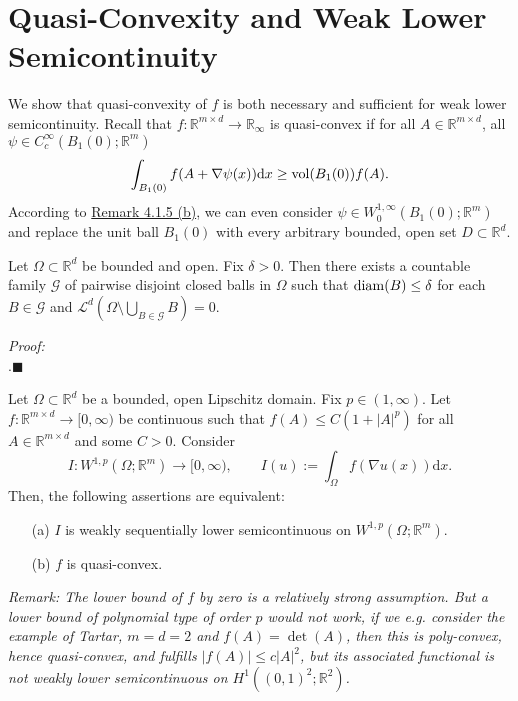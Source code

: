 \section{Quasi-Convexity and Weak Lower Semicontinuity}
We show that quasi-convexity of $f$ is both necessary and sufficient for weak lower semicontinuity. Recall that $f:\mathbb{R}^{m\times d}\longrightarrow\mathbb{R}_\infty$ is quasi-convex if for all $A\in\mathbb{R}^{m\times d}$, all $\psi\in C_c^\infty(B_1(0);\mathbb{R}^m)$
\[\int_{B_1(0)}{f(A+\nabla\psi(x))\mathrm{d}x}\geq\operatorname{vol}\mathopen{}\left(B_1(0)\right)\mathclose{}f(A).\]
According to \hyperlink{remark_4_1_5}{Remark 4.1.5 (b)}, we can even consider $\psi\in W_0^{1,\infty}(B_1(0);\mathbb{R}^m)$ and replace the unit ball $B_1(0)$ with every arbitrary bounded, open set $D\subset\mathbb{R}^d$.\\

\begin{theorem}
Let $\Omega\subset\mathbb{R}^d$ be bounded and open. Fix $\delta>0$. Then there exists a countable family $\mathcal{G}$ of pairwise disjoint closed balls in $\Omega$ such that $\operatorname{diam}\mathopen{}\left(B\right)\mathclose{}\leq\delta$ for each $B\in\mathcal{G}$ and $\mathcal{L}^d(\Omega\setminus\bigcup_{B\in\mathcal{G}}{B})=0$.
\end{theorem}
\textit{Proof:}\\
\cite[Kapitel V, §1 Produktma{\ss}e, 5. Das $p$-dimensionale \"au{\ss}ere Hausdorff-Ma{\ss}, Satz 1.14]{Elst1996MIT}.\hfill$\blacksquare$\\[11pt]

\begin{theorem}
Let $\Omega\subset\mathbb{R}^d$ be a bounded, open Lipschitz domain. Fix $p\in(1,\infty)$. Let $f:\mathbb{R}^{m\times d}\longrightarrow[0,\infty)$ be continuous such that $f(A)\leq C(1+\lvert A\rvert^p)$ for all $A\in\mathbb{R}^{m\times d}$ and some $C>0$. Consider
\[I:W^{1,p}(\Omega;\mathbb{R}^m)\longrightarrow[0,\infty),\qquad I(u):=\int_\Omega{f(\nabla u(x))\mathrm{d}x}.\]
Then, the following assertions are equivalent:
\begin{itemize}
	\item[(a)] $I$ is weakly sequentially lower semicontinuous on $W^{1,p}(\Omega;\mathbb{R}^m)$.
	\item[(b)] $f$ is quasi-convex.\\
\end{itemize}
\end{theorem}
\textit{Remark: The lower bound of $f$ by zero is a relatively strong assumption. But a lower bound of polynomial type of order $p$ would not work, if we e.g. consider the example of Tartar, $m=d=2$ and $f(A)=\det(A)$, then this is poly-convex, hence quasi-convex, and fulfills $\lvert f(A)\rvert\leq c\lvert A\rvert^2$, but its associated functional is not weakly lower semicontinuous on $H^1((0,1)^2;\mathbb{R}^2)$.}\\

